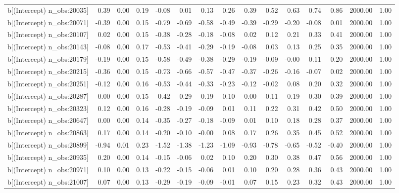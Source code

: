 \begin{table}[ht]
\begin{tabular}{rrrrrrrrrrrrrrr}
  b[(Intercept) n\_obs:20035] & 0.39 & 0.00 & 0.19 & -0.08 & 0.01 & 0.13 & 0.26 & 0.39 & 0.52 & 0.63 & 0.74 & 0.86 & 2000.00 & 1.00 \\ 
  b[(Intercept) n\_obs:20071] & -0.39 & 0.00 & 0.15 & -0.79 & -0.69 & -0.58 & -0.49 & -0.39 & -0.29 & -0.20 & -0.08 & 0.01 & 2000.00 & 1.00 \\ 
  b[(Intercept) n\_obs:20107] & 0.02 & 0.00 & 0.15 & -0.38 & -0.28 & -0.18 & -0.08 & 0.02 & 0.12 & 0.21 & 0.33 & 0.41 & 2000.00 & 1.00 \\ 
  b[(Intercept) n\_obs:20143] & -0.08 & 0.00 & 0.17 & -0.53 & -0.41 & -0.29 & -0.19 & -0.08 & 0.03 & 0.13 & 0.25 & 0.35 & 2000.00 & 1.00 \\ 
  b[(Intercept) n\_obs:20179] & -0.19 & 0.00 & 0.15 & -0.58 & -0.49 & -0.38 & -0.29 & -0.19 & -0.09 & -0.00 & 0.11 & 0.20 & 2000.00 & 1.00 \\ 
  b[(Intercept) n\_obs:20215] & -0.36 & 0.00 & 0.15 & -0.73 & -0.66 & -0.57 & -0.47 & -0.37 & -0.26 & -0.16 & -0.07 & 0.02 & 2000.00 & 1.00 \\ 
  b[(Intercept) n\_obs:20251] & -0.12 & 0.00 & 0.16 & -0.53 & -0.44 & -0.33 & -0.23 & -0.12 & -0.02 & 0.08 & 0.20 & 0.32 & 2000.00 & 1.00 \\ 
  b[(Intercept) n\_obs:20287] & 0.00 & 0.00 & 0.15 & -0.42 & -0.29 & -0.19 & -0.10 & 0.00 & 0.11 & 0.19 & 0.30 & 0.39 & 2000.00 & 1.00 \\ 
  b[(Intercept) n\_obs:20323] & 0.12 & 0.00 & 0.16 & -0.28 & -0.19 & -0.09 & 0.01 & 0.11 & 0.22 & 0.31 & 0.42 & 0.50 & 2000.00 & 1.00 \\ 
  b[(Intercept) n\_obs:20647] & 0.00 & 0.00 & 0.14 & -0.35 & -0.27 & -0.18 & -0.09 & 0.01 & 0.10 & 0.18 & 0.28 & 0.37 & 2000.00 & 1.00 \\ 
  b[(Intercept) n\_obs:20863] & 0.17 & 0.00 & 0.14 & -0.20 & -0.10 & -0.00 & 0.08 & 0.17 & 0.26 & 0.35 & 0.45 & 0.52 & 2000.00 & 1.00 \\ 
  b[(Intercept) n\_obs:20899] & -0.94 & 0.01 & 0.23 & -1.52 & -1.38 & -1.23 & -1.09 & -0.93 & -0.78 & -0.65 & -0.52 & -0.40 & 2000.00 & 1.00 \\ 
  b[(Intercept) n\_obs:20935] & 0.20 & 0.00 & 0.14 & -0.15 & -0.06 & 0.02 & 0.10 & 0.20 & 0.30 & 0.38 & 0.47 & 0.56 & 2000.00 & 1.00 \\ 
  b[(Intercept) n\_obs:20971] & 0.10 & 0.00 & 0.13 & -0.22 & -0.15 & -0.06 & 0.01 & 0.10 & 0.20 & 0.28 & 0.36 & 0.43 & 2000.00 & 1.00 \\ 
  b[(Intercept) n\_obs:21007] & 0.07 & 0.00 & 0.13 & -0.29 & -0.19 & -0.09 & -0.01 & 0.07 & 0.15 & 0.23 & 0.32 & 0.43 & 2000.00 & 1.00 \\ 

\end{tabular}
\end{table}
